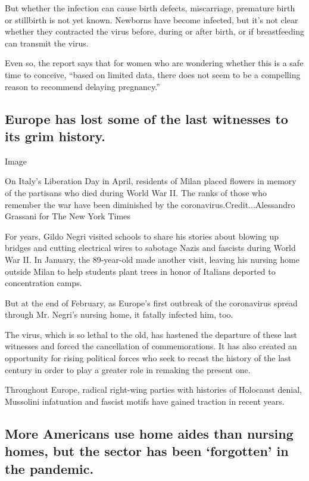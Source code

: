 But whether the infection can cause birth defects, miscarriage,
premature birth or stillbirth is not yet known. Newborns have become
infected, but it's not clear whether they contracted the virus before,
during or after birth, or if breastfeeding can transmit the virus.

Even so, the report says that for women who are wondering whether this
is a safe time to conceive, ``based on limited data, there does not seem
to be a compelling reason to recommend delaying pregnancy.''

\hypertarget{europe-has-lost-some-of-the-last-witnesses-to-its-grim-history}{%
\subsection{Europe has lost some of the last witnesses to its grim
history.}\label{europe-has-lost-some-of-the-last-witnesses-to-its-grim-history}}

Image

On Italy's Liberation Day in April, residents of Milan placed flowers in
memory of the partisans who died during World War II. The ranks of those
who remember the war have been diminished by the
coronavirus.Credit...Alessandro Grassani for The New York Times

For years, Gildo Negri visited schools to share his stories about
blowing up bridges and cutting electrical wires to sabotage Nazis and
fascists during World War II. In January, the 89-year-old made another
visit, leaving his nursing home outside Milan to help students plant
trees in honor of Italians deported to concentration camps.

But at the end of February, as Europe's first outbreak of the
coronavirus spread through Mr. Negri's nursing home, it fatally infected
him, too.

The virus, which is so lethal to the old, has hastened the departure of
these last witnesses and forced the cancellation of commemorations. It
has also created an opportunity for rising political forces who seek to
recast the history of the last century in order to play a greater role
in remaking the present one.

Throughout Europe, radical right-wing parties with histories of
Holocaust denial, Mussolini infatuation and fascist motifs have gained
traction in recent years.

\hypertarget{more-americans-use-home-aides-than-nursing-homes-but-the-sector-has-been-forgotten-in-the-pandemic}{%
\subsection{More Americans use home aides than nursing homes, but the
sector has been `forgotten' in the
pandemic.}\label{more-americans-use-home-aides-than-nursing-homes-but-the-sector-has-been-forgotten-in-the-pandemic}}

